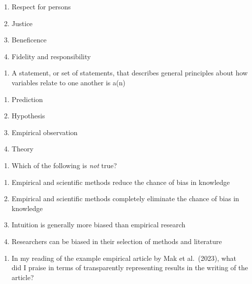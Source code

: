 \documentclass[
  12pt,
  letterpaper,
  DIV=11,
  numbers=noendperiod]{scrartcl}
\providecommand{\tightlist}{%
  \setlength{\itemsep}{0pt}\setlength{\parskip}{0pt}}\usepackage{longtable,booktabs,array}
\begin{document}
\begin{enumerate}
\def\labelenumi{\alph{enumi}.}
\tightlist
\item
  Respect for persons
\item
  Justice
\item
  Beneficence
\item
  Fidelity and responsibility
\end{enumerate}

\begin{enumerate}
\def\labelenumi{\arabic{enumi}.}
\setcounter{enumi}{38}
\tightlist
\item
  A statement, or set of statements, that describes general principles
  about how variables relate to one another is a(n)
\end{enumerate}

\begin{enumerate}
\def\labelenumi{\alph{enumi}.}
\tightlist
\item
  Prediction
\item
  Hypothesis
\item
  Empirical observation
\item
  Theory
\end{enumerate}

\begin{enumerate}
\def\labelenumi{\arabic{enumi}.}
\setcounter{enumi}{39}
\tightlist
\item
  Which of the following is \emph{not} true?
\end{enumerate}

\begin{enumerate}
\def\labelenumi{\alph{enumi}.}
\tightlist
\item
  Empirical and scientific methods reduce the chance of bias in
  knowledge
\item
  Empirical and scientific methods completely eliminate the chance of
  bias in knowledge
\item
  Intuition is generally more biased than empirical research
\item
  Researchers can be biased in their selection of methods and literature
\end{enumerate}

\begin{enumerate}
\def\labelenumi{\arabic{enumi}.}
\setcounter{enumi}{40}
\tightlist
\item
  In my reading of the example empirical article by Mak et al.~(2023),
  what did I praise in terms of transparently representing results in
  the writing of the article?
\end{enumerate}
\end{document}
